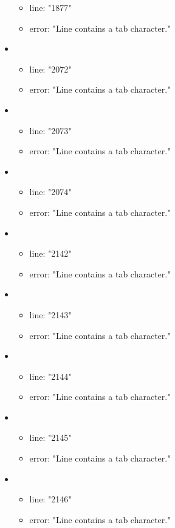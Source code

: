 \begin{itemize}
\begin{itemize}
		\item line: "1877" 
		\item error: "Line contains a tab character." 
	\end{itemize}
	\item 
	\begin{itemize} 
		\item line: "2072" 
		\item error: "Line contains a tab character." 
	\end{itemize}
	\item 
	\begin{itemize} 
		\item line: "2073" 
		\item error: "Line contains a tab character." 
	\end{itemize}
	\item 
	\begin{itemize} 
		\item line: "2074" 
		\item error: "Line contains a tab character." 
	\end{itemize}
	\item 
	\begin{itemize} 
		\item line: "2142" 
		\item error: "Line contains a tab character." 
	\end{itemize}
	\item 
	\begin{itemize} 
		\item line: "2143" 
		\item error: "Line contains a tab character." 
	\end{itemize}
	\item 
	\begin{itemize} 
		\item line: "2144" 
		\item error: "Line contains a tab character." 
	\end{itemize}
	\item 
	\begin{itemize} 
		\item line: "2145" 
		\item error: "Line contains a tab character." 
	\end{itemize}
	\item 
	\begin{itemize} 
		\item line: "2146" 
		\item error: "Line contains a tab character." 

\end{itemize}
\end{itemize}
